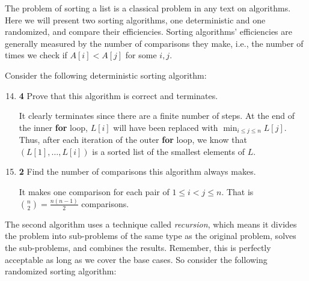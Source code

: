 \documentclass[12pt]{article}
\theoremstyle{plain}
\theoremstyle{definition}
\theoremstyle{remark}
\newcommand{\pts}[1]{\lbrack\textbf{#1}\rbrack}
\begin{document}
The problem of sorting a list is a classical problem in any text on algorithms. Here we will present two sorting algorithms, one deterministic and one randomized, and compare their efficiencies. Sorting algorithms' efficiencies are generally measured by the number of comparisons they make, i.e., the number of times we check if $A[i]<A[j]$ for some $i,j$.

Consider the following deterministic sorting algorithm:

\newpage

\begin{algorithm}
\DontPrintSemicolon
{}
\end{algorithm}

\vspace{-10pt}

\begin{enumerate}
\setcounter{enumi}{13}

\item \pts{4} Prove that this algorithm is correct and terminates.

\begin{tcolorbox}
It clearly terminates since there are a finite number of steps. At the end of the inner \textbf{for} loop, $L[i]$ will have been replaced with $\min_{i\le j\le n}L[j]$. Thus, after each iteration of the outer \textbf{for} loop, we know that $(L[1],\dots,L[i])$ is a sorted list of the smallest elements of $L$.
\end{tcolorbox}

\item \pts{2} Find the number of comparisons this algorithm always makes.

\begin{tcolorbox}
It makes one comparison for each pair of $1\le i<j\le n$. That is $\binom{n}2=\frac{n(n-1)}2$ comparisons.
\end{tcolorbox}
\end{enumerate}

The second algorithm uses a technique called \emph{recursion}, which means it divides the problem into sub-problems of the same type as the original problem, solves the sub-problems, and combines the results. Remember, this is perfectly acceptable as long as we cover the base cases. So consider the following randomized sorting algorithm:
\end{document}
